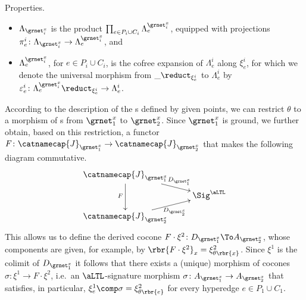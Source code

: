 \documentclass{LMCS}
\begin{document}
\begin{minisection}{Properties.}
\begin{itemize}
    \item \(\Lambda_{\grnet_{i}^{x}}\) is the product \(\prod_{e \in P_{i} \cup C_{i}} \Lambda^{\grnet_{i}^{x}}_{e}\), equipped with projections \(\pi^{i}_{e} \colon \Lambda_{\grnet_{i}^{x}} \to \Lambda^{\grnet_{i}^{x}}_{e}\), and

    \item \(\Lambda^{\grnet_{i}^{x}}_{e}\), for \(e \in P_{i} \cup C_{i}\), is the cofree expansion of \(\Lambda^{i}_{e}\) along \(\xi^{i}_{e}\), for which we denote the universal morphism from \(\_ \reduct_{\xi^{i}_{e}}\) to \(\Lambda^{i}_{e}\) by \(\varepsilon^{i}_{e} \colon \Lambda^{\grnet_{i}^{x}}_{e} \reduct_{\xi^{i}_{e}} \to \Lambda^{i}_{e}\).
      
    \end{itemize}
    According to the description of the s defined by given points, we can restrict \(\theta\) to a morphism of s from \(\grnet_{1}^{x}\) to \(\grnet_{2}^{x}\).
    Since \(\grnet_{1}^{x}\) is ground, we further obtain, based on this restriction, a functor \(F \colon \catnamecap{J}_{\grnet_{1}^{x}} \to \catnamecap{J}_{\grnet_{2}^{x}}\) that makes the following diagram commutative.
    \[
    \xymatrix @R-4ex {
      {\catnamecap{J}_{\grnet_{1}^{x}}}
      \ar [dr] ^-{D_{\grnet_{1}^{x}}}
      \ar [dd] _{F}
      \\
      & {\Sig^{\aLTL}}
      \\
      {\catnamecap{J}_{\grnet_{2}^{x}}}
      \ar [ur] _-{D_{\grnet_{2}^{x}}}
    }
    \]
    This allows us to define the derived cocone \(F \cdot \xi^{2} \colon D_{\grnet_{1}^{x}} \To A_{\grnet_{2}^{x}}\), whose components are given, for example, by \(\rbr{F \cdot \xi^{2}}_{x} = \xi^{2}_{\theta\rbr{x}}\).
    Since \(\xi^{1}\) is the colimit of \(D_{\grnet_{1}^{x}}\) it follows that there exists a (unique) morphism of cocones \(\sigma \colon \xi^{1} \to F \cdot \xi^{2}\), i.e.\ an \(\aLTL\)\nb-signature morphism \(\sigma \colon A_{\grnet_{1}^{x}} \to A_{\grnet_{2}^{x}}\) that satisfies, in particular, \(\xi^{1}_{e} \comp \sigma = \xi^{2}_{\theta\rbr{e}}\) for every hyperedge \(e \in P_{1} \cup C_{1}\).


\end{minisection}
\end{document}
